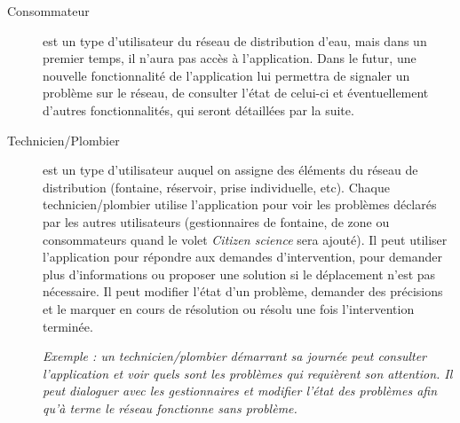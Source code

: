 \documentclass[a4paper, 11pt]{article}
\begin{document}
\begin{description}
    \item[Consommateur] est un type d'utilisateur du réseau de distribution d'eau, mais dans un premier temps, il n'aura pas accès à l'application. Dans le futur, une nouvelle fonctionnalité de l'application lui permettra de signaler un problème sur le réseau, de consulter l'état de celui-ci et éventuellement d'autres fonctionnalités, qui seront détaillées par la suite.

    \item[Technicien/Plombier] est un type d'utilisateur auquel on assigne des éléments du réseau de distribution (fontaine, réservoir, prise individuelle, etc). Chaque technicien/plombier utilise l'application pour voir les problèmes déclarés par les autres utilisateurs (gestionnaires de fontaine, de zone ou consommateurs quand le volet \emph{Citizen science} sera ajouté). Il peut utiliser l'application pour répondre aux demandes d'intervention, pour demander plus d'informations ou proposer une solution si le déplacement n'est pas nécessaire. Il peut modifier l'état d'un problème, demander des précisions et le marquer en cours de résolution ou résolu une fois l'intervention terminée.

    \emph{Exemple : un technicien/plombier démarrant sa journée peut consulter l'application et voir quels sont les problèmes qui requièrent son attention. Il peut dialoguer avec les gestionnaires et modifier l'état des problèmes afin qu'à terme le réseau fonctionne sans problème.}

  \end{description}
\end{document}
